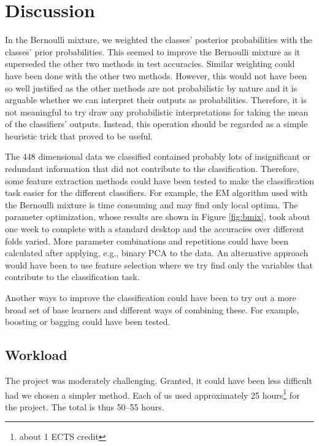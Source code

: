 \section{Discussion} \label{sec:discussion}

In the Bernoulli mixture, we weighted the classes' posterior
probabilities with the classes' prior probabilities. This seemed to
improve the Bernoulli mixture as it superseded the other two methods in
test accuracies. Similar weighting could have been done with the other
two methods. However, this would not have been so well justified as the
other methods are not probabilistic by nature and it is arguable whether
we can interpret their outputs as probabilities. Therefore, it is not
meaningful to try draw any probabilistic interpretations for taking the
mean of the classifiers' outputs. Instead, this operation should be
regarded as a simple heuristic trick that proved to be useful.

The 448 dimensional data we classified contained probably lots of
insignificant or redundant information that did not contribute to the
classification. Therefore, some feature extraction methods could have
been tested to make the classification task easier for the different
classifiers. For example, the EM algorithm used with the Bernoulli
mixture is time consuming and may find only local optima. The parameter
optimization, whose results are shown in Figure \ref{fig:bmix}, took
about one week to complete with a standard desktop and the accuracies
over different folds varied. More parameter combinations and repetitions
could have been calculated after applying, e.g., binary PCA to the data.
An alternative approach would have been to use feature selection where
we try find only the variables that contribute to the classification
task.

Another ways to improve the classification could have been to try out a
more broad set of base learners and different ways of combining these.
For example, boosting or bagging could have been tested.

\subsection{Workload}

The project was moderately challenging. Granted, it could have been less difficult had we chosen a simpler method. Each of us used approximately 25 hours\footnote{about 1 ECTS credit} for the project. The total is thus 50--55 hours.

